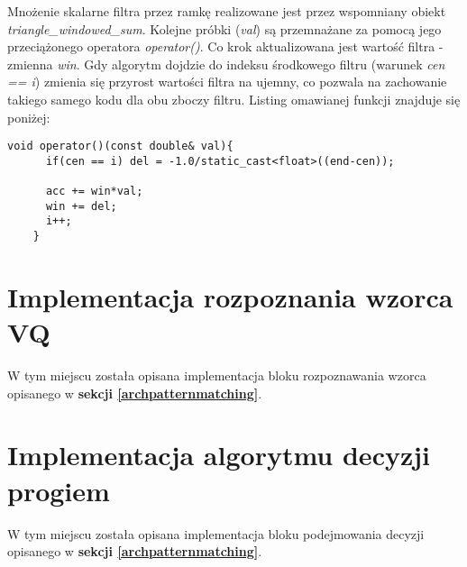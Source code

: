 \begin{itemize}
 Mnożenie skalarne filtra przez ramkę realizowane jest przez wspomniany obiekt \textit{triangle\_windowed\_sum}. Kolejne próbki (\textit{val}) są przemnażane za pomocą jego przeciążonego operatora \textit{operator()}. Co krok aktualizowana jest wartość filtra - zmienna \textit{win}. Gdy algorytm dojdzie do indeksu środkowego filtru (warunek \textit{cen == i}) zmienia się przyrost wartości filtra na ujemny, co pozwala na zachowanie takiego samego kodu dla obu zboczy filtru. Listing omawianej funkcji znajduje się poniżej:
 \begin{lstlisting}[style=lst:cpp]
    void operator()(const double& val){
      if(cen == i) del = -1.0/static_cast<float>((end-cen));

      acc += win*val;
      win += del;
      i++;
    }
 \end{lstlisting}
\end{itemize}

\section{Implementacja rozpoznania wzorca VQ}

W tym miejscu została opisana implementacja bloku rozpoznawania wzorca opisanego w \textbf{sekcji \ref{archpatternmatching}}.

\section{Implementacja algorytmu decyzji progiem}

W tym miejscu została opisana implementacja bloku podejmowania decyzji opisanego w \textbf{sekcji \ref{archpatternmatching}}.
